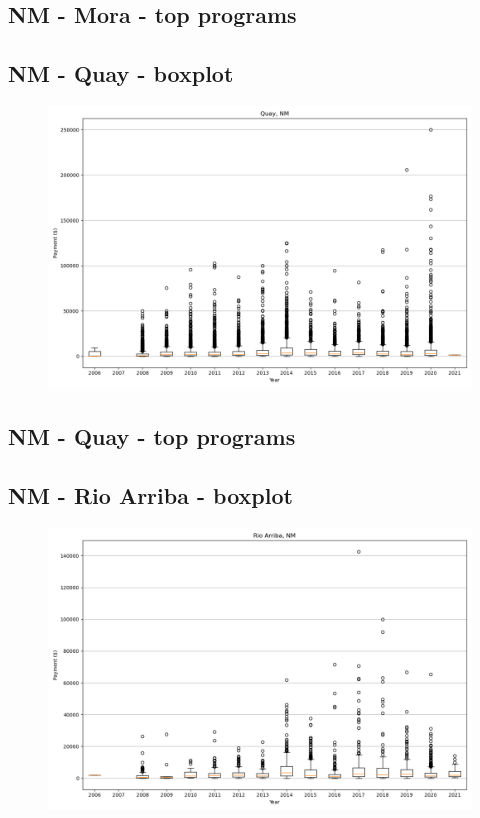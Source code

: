 \subsection*{NM - Mora - top programs}

\newpage
\subsection*{NM - Quay - boxplot}
\begin{figure}[h]
\centering
\includegraphics[width=7in]{../output/boxplots/counties/Quay-NM_boxplot.png}
\end{figure}


\subsection*{NM - Quay - top programs}

\newpage
\subsection*{NM - Rio Arriba - boxplot}
\begin{figure}[h]
\centering
\includegraphics[width=7in]{../output/boxplots/counties/Rio Arriba-NM_boxplot.png}
\end{figure}


